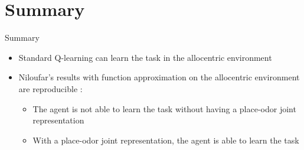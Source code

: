 \documentclass[bigger]{beamer}
\begin{document}
\section{Summary}
\label{sec:orgc93c3a5}
\begin{frame}[<+->][label={sec:org52d6489}]{Summary}
\begin{itemize}
\item Standard Q-learning can learn the task in the allocentric environment
\item Niloufar's results with function approximation on the allocentric environment are reproducible :
\begin{itemize}
\item The agent is \alert{not able to learn} the task \alert{without} having a place-odor joint representation
\item \alert{With} a place-odor joint representation, the agent is \alert{able to learn the task}
\end{itemize}
\end{itemize}
\end{frame}
\end{document}

